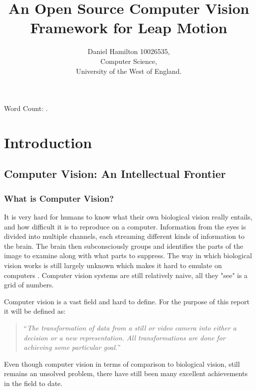 \documentclass[11pt,oneside]{report}
\title{An Open Source Computer Vision Framework for Leap Motion}
\author{Daniel Hamilton 10026535,\\Computer Science,\\University of the West of England.}
\begin{document}
	\maketitle
	\tableofcontents
	\listoffigures
	\listoftables
	
	Word Count: \bashStdout.
	\begin{abstract}
	
	\end{abstract}	
	\chapter{Introduction}\label{chap:introduction}
		\section{Computer Vision: An Intellectual Frontier}
			\subsection{What is Computer Vision?}		
				
				It is very hard for humans to know what their own biological vision really entails, and how difficult it is to reproduce on a computer.
				Information from the eyes is divided into multiple channels, each streaming different kinds of information to the brain.
				The brain then subconsciously groups and identifies the parts of the image to examine along with what parts to suppress.
				The way in which biological vision works is still largely unknown which makes it hard to emulate on computers \cite[p. xi]{book:multiViewGeo}.				
				Computer vision systems are still relatively naive, all they "see" is a grid of numbers.%
				
				
				Computer vision is a vast field and hard to define.
				For the purpose of this report it will be defined as:
	
				\begin{quote}
					``\textit{The transformation of data from a still or video camera into either a decision or a new representation.
						All transformations are done for achieving some particular goal.}'' \cite[p. 2]{definition:cv}
				\end{quote}
				
				Even though computer vision in terms of comparison to biological vision, still remains an unsolved problem, there have still been many excellent achievements in the field to date.
\end{document}
